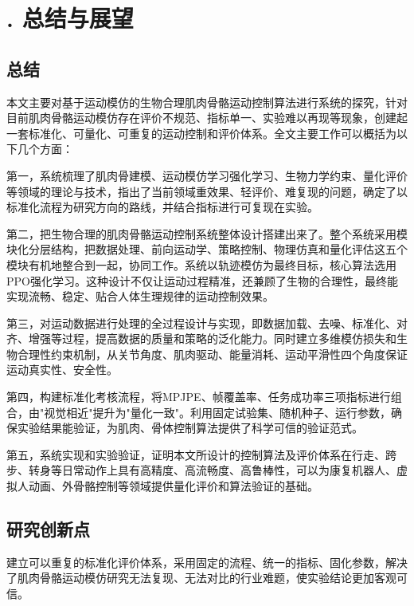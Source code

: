 
\chapter{. 总结与展望}\label{ux603bux7ed3ux4e0eux5c55ux671b}

\section{总结}\label{ux603bux7ed3}

本文主要对基于运动模仿的生物合理肌肉骨骼运动控制算法进行系统的探究，针对目前肌肉骨骼运动模仿存在评价不规范、指标单一、实验难以再现等现象，创建起一套标准化、可量化、可重复的运动控制和评价体系。全文主要工作可以概括为以下几个方面：

第一，系统梳理了肌肉骨建模、运动模仿学习强化学习、生物力学约束、量化评价等领域的理论与技术，指出了当前领域重效果、轻评价、难复现的问题，确定了以标准化流程为研究方向的路线，并结合指标进行可复现在实验。

第二，把生物合理的肌肉骨骼运动控制系统整体设计搭建出来了。整个系统采用模块化分层结构，把数据处理、前向运动学、策略控制、物理仿真和量化评估这五个模块有机地整合到一起，协同工作。系统以轨迹模仿为最终目标，核心算法选用PPO强化学习。这种设计不仅让运动过程精准，还兼顾了生物的合理性，最终能实现流畅、稳定、贴合人体生理规律的运动控制效果。

第三，对运动数据进行处理的全过程设计与实现，即数据加载、去噪、标准化、对齐、增强等过程，提高数据的质量和策略的泛化能力。同时建立多维模仿损失和生物合理性约束机制，从关节角度、肌肉驱动、能量消耗、运动平滑性四个角度保证运动真实性、安全性。

第四，构建标准化考核流程，将MPJPE、帧覆盖率、任务成功率三项指标进行组合，由"视觉相近"提升为"量化一致"。利用固定试验集、随机种子、运行参数，确保实验结果能验证，为肌肉、骨体控制算法提供了科学可信的验证范式。

第五，系统实现和实验验证，证明本文所设计的控制算法及评价体系在行走、跨步、转身等日常动作上具有高精度、高流畅度、高鲁棒性，可以为康复机器人、虚拟人动画、外骨骼控制等领域提供量化评价和算法验证的基础。

\section{研究创新点}\label{ux7814ux7a76ux521bux65b0ux70b9}

建立可以重复的标准化评价体系，采用固定的流程、统一的指标、固化参数，解决了肌肉骨骼运动模仿研究无法复现、无法对比的行业难题，使实验结论更加客观可信。

